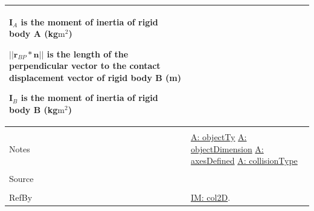 \documentclass[12pt]{article}
\begin{document}
\begin{minipage}{\textwidth}
\begin{tabular}{p{} p{}}
\begin{symbDescription}
                                                  \item{${\mathbf{I}_{A}}$ is the moment of inertia of rigid body A (kg$\text{m}^{2}$)}
                                                  \item{$||{\mathbf{r}_{BP}}*\mathbf{n}||$ is the length of the perpendicular vector to the contact displacement vector of rigid body B (m)}
                                                  \item{${\mathbf{I}_{B}}$ is the moment of inertia of rigid body B (kg$\text{m}^{2}$)}
                                                  \end{symbDescription}
                                                  \\ \midrule \\
                                                  Notes & \hyperref[A:objectTy]{A: objectTy}
                                                          \hyperref[A:objectDimension]{A: objectDimension}
                                                          \hyperref[A:axesDefined]{A: axesDefined}
                                                          \hyperref[A:collisionType]{A: collisionType}
                                                          \\ \midrule \\
                                                          Source & \\ \midrule \\
                                                                   RefBy & \hyperref[IM:col2D]{IM: col2D}.
\\ \bottomrule \end{tabular}
\end{minipage}
\par~
\end{document}

